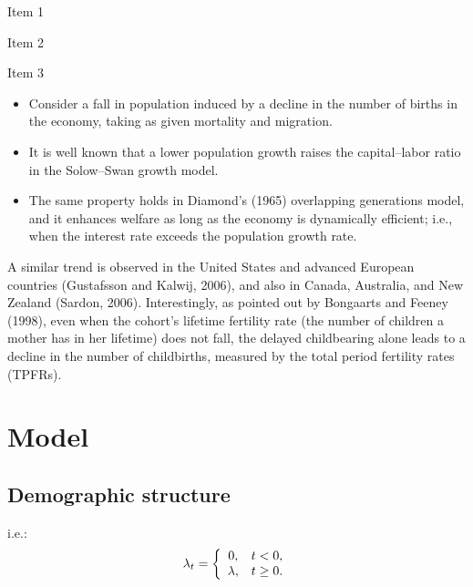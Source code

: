 \documentclass[nogrid]{MBE}%
\begin{document}
\begin{arabiclist}
\item Item 1

\item Item 2

\item Item 3
\end{arabiclist}

\begin{itemize}
\item Consider a fall in population induced by a decline in the number of births in the economy,
taking as given mortality and migration.

\item It is well known that a lower population growth raises the capital--labor ratio in the Solow--Swan
growth model.

\item The same property holds in Diamond's (1965) overlapping generations model, and it enhances welfare
as long as the economy is dynamically efficient; i.e., when the interest rate exceeds the
population growth rate.
\end{itemize}
 A similar trend is observed in the United
States and advanced European countries (Gustafsson and Kalwij, 2006), and also in Canada,
Australia, and New Zealand (Sardon, 2006). Interestingly, as pointed out by Bongaarts and Feeney
(1998), even when the cohort's lifetime fertility rate (the number of children a mother has in her
lifetime) does not fall, the delayed childbearing alone leads to a decline in the number of
childbirths, measured by the total period fertility rates (TPFRs). %


\section{Model\label{sec:Model}}

\subsection{Demographic structure}



i.e.:
\begin{equation}
\lambda_{t}=\left\{
\begin{array}
[c]{cc}%
0, & t<0,\\
\lambda, & t\geq0.
\end{array}
\right.  \label{eq:lambda}%
\end{equation}
\end{document}
